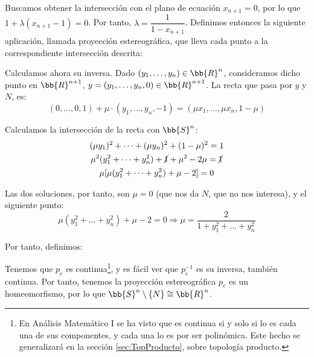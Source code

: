 \begin{ejemplo}
\begin{enumerate}
        Buscamos obtener la intersección con el plano de ecuación $x_{n+1}=0$, por lo que $1+\lambda(x_{n+1}-1)=0$. Por tanto, $\lambda=\dfrac{1}{1-x_{n+1}}$. Definimos entonces la siguiente aplicación, llamada proyección estereográfica, que lleva cada punto a la correspondiente intersección descrita:

        Calculamos ahora su inversa. Dado $(y_1,\dots,y_n)\in \bb{R}^n$, consideramos dicho punto en $\bb{R}^{n+1}$, $y=(y_1,\dots,y_n, 0)\in \bb{R}^{n+1}$. La recta que pasa por $y$ y $N$, es:
        \begin{equation*}
            (0,\dots,0,1)+\mu\cdot (y_1,\dots,y_n,-1)
            = (\mu x_1,\dots,\mu x_n,1-\mu)
        \end{equation*}

        Calculamos la intersección de la recta con $\bb{S}^n$:
        \begin{gather*}
            (\mu y_1)^2 + \dots + (\mu y_n)^2 +(1-\mu)^2 = 1\\
            \mu^2(y_1^2+\dots + y_n^2) + \cancel{1} +\mu^2 -2\mu=\cancel{1}\\
            \mu[\mu(y_1^2+\dots + y_n^2) +\mu-2]=0
        \end{gather*}

        Las dos soluciones, por tanto, son $\mu=0$ (que nos da $N$, que no nos interesa), y el siguiente punto:
        \begin{equation*}
            \mu(y_1^2+\dots + y_n^2) +\mu-2 = 0 \Longrightarrow \mu=\frac{2}{1+y_1^2+\dots+y_n^2}
        \end{equation*}

        Por tanto, definimos:

        Tenemos que $p_e$ es continua\footnote{En Análisis Matemático I se ha visto que es continua si y solo si lo es cada una de sus componentes, y cada una lo es por ser polinómica. Este hecho se generalizará en la sección \ref{sec:TopProducto}, sobre topología producto.}, y es fácil ver que $p_e^{-1}$ es su inversa, también continua. Por tanto, tenemos la proyección estereográfica $p_e$ es un homeomorfismo, por lo que $\bb{S}^n\setminus \{N\}\cong \bb{R}^n$.


\end{enumerate}
\end{ejemplo}
